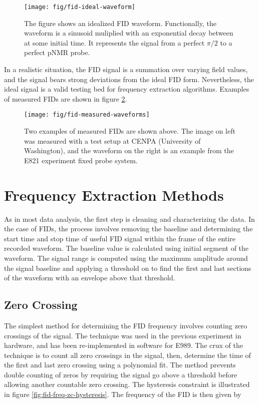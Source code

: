 \begin{figure}
\label{fig:fid-ideal-waveform}
\centering
\texttt{[image: fig/fid-ideal-waveform]}
\caption{The figure shows an idealized FID waveform. Functionally, the waveform is a sinusoid muliplied with an exponential decay between at some initial time.  It represents the signal from a perfect $\pi/2$ to a perfect pNMR probe.}
\end{figure}

In a realistic situation, the FID signal is a summation over varying field values, and the signal bears strong deviations from the ideal FID form.  Nevertheless, the ideal signal is a valid testing bed for frequency extraction algorithms.  Examples of measured FIDs are shown in figure \ref{fig:fid-measured-waveforms}.

\begin{figure}
\label{fig:fid-measured-waveforms}
\texttt{[image: fig/fid-measured-waveforms]}
\caption{Two examples of measured FIDs are shown above. The image on left was measured with a test setup at CENPA (University of Washington), and the waveform on the right is an example from the E821 experiment fixed probe system.}
\end{figure}

\section{Frequency Extraction Methods}

As in most data analysis, the first step is cleaning and characterizing the data.  In the case of FIDs, the process involves removing the baseline  and determining the start time and stop time of useful FID signal within the frame of the entire recorded waveform.  The baseline value is calculated using initial segment of the waveform.  The signal range is computed using the maximum amplitude around the signal baseline and applying a threshold on to find the first and last sections of the waveform with an envelope above that threshold.

\subsection{Zero Crossing}
The simplest method for determining the FID frequency involves counting zero crossings of the signal.  The technique was used in the previous \mugmtwo experiment in hardware, and has been re-implemented in software for E989.  The crux of the technique is to count all zero crossings in the signal, then, determine the time of the first and last zero crossing using a polynomial fit.  The method prevents double counting of zeros by requiring the signal go above a threshold before allowing another countable zero crossing.  The hysteresis constraint is illustrated in figure \ref{fig:fid-freq-zc-hysteresis}.  The frequency of the FID is then given by

